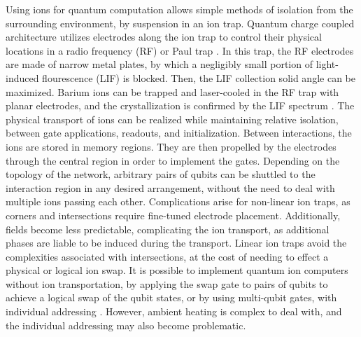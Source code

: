 \documentclass[12pt,a4paper]{amsart}
\numberwithin{equation}{section}
\theoremstyle{plain}
\theoremstyle{definition}
\begin{document}
Using ions for quantum computation allows simple methods of isolation from the surrounding environment, by suspension in an ion trap. Quantum charge coupled architecture utilizes electrodes along the ion trap to control their physical locations in a radio frequency (RF) or Paul trap \cite{compArchLarg}. In this trap, the RF electrodes are made of narrow metal plates, by which a negligibly small portion of light-induced flourescence (LIF) is blocked. Then, the LIF collection solid angle can be maximized. Barium ions can be trapped and laser-cooled in the RF trap with planar electrodes, and the crystallization is confirmed by the LIF spectrum \cite{ioniReviArt,miscQuanPap2}. The physical transport of ions can be realized while maintaining relative isolation, between gate applications, readouts, and initialization.
Between interactions, the ions are stored in memory regions. They are then propelled by the electrodes through the central region in order to implement the gates. Depending on the topology of the network, arbitrary pairs of qubits can be shuttled to the interaction region in any desired arrangement, without the need to deal with multiple ions passing each other. 
Complications arise for non-linear ion traps, as corners and intersections require fine-tuned electrode placement. Additionally, fields become less predictable, complicating the ion transport, as additional phases are liable to be induced during the transport. Linear ion traps avoid the complexities associated with intersections, at the cost of needing to effect a physical or logical ion swap. It is possible to implement quantum ion computers without ion transportation, by applying the swap gate to pairs of qubits to achieve a logical swap of the qubit states, or by using multi-qubit gates, with individual addressing \cite{fundQuanIoni}. However, ambient heating is complex to deal with, and the individual addressing may also become problematic.
\end{document}
